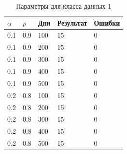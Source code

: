 \begin{table}[!h]
	\begin{center}
		\begin{flushleft}
			\captionsetup{margin*=125pt}
			\caption{\label{tab:class1}Параметры для класса данных 1\label{tbl:table_kd1}}
		\end{flushleft}
		\begin{tabular}{|l | l | l | l | l | } \hline
			$\alpha$ & $\rho$ & Дни & Результат & Ошибки \\ \hline
			0.1 &  0.9 &  100 &    15 &     0 \\
			0.1 &  0.9 &  200 &    15 &     0 \\
			0.1 &  0.9 &  300 &    15 &     0 \\
			0.1 &  0.9 &  400 &    15 &     0 \\
			0.1 &  0.9 &  500 &    15 &     0 \\
			\hline
			0.2 &  0.8 &  100 &    15 &     0 \\
			0.2 &  0.8 &  200 &    15 &     0 \\
			0.2 &  0.8 &  300 &    15 &     0 \\
			0.2 &  0.8 &  400 &    15 &     0 \\
			0.2 &  0.8 &  500 &    15 &     0 \\
			\hline
		\end{tabular}
	\end{center}
\end{table}


